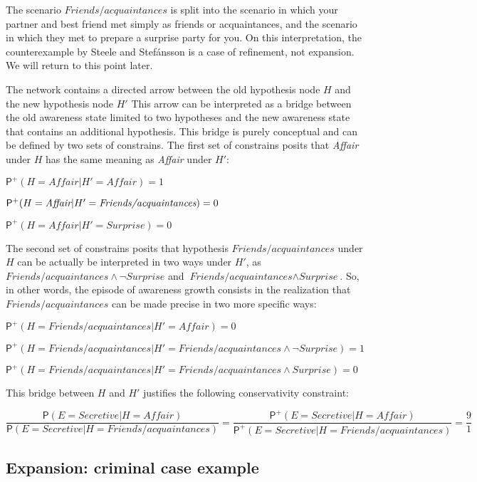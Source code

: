 \documentclass[
  11pt,
  dvipsnames,enabledeprecatedfontcommands]{scrartcl}
\newcommand{\pr}[1]{\ensuremath{\mathsf{P}(#1)}}
\newcommand{\ppr}[2]{\ensuremath{\mathsf{P}^{#1}(#2)}}
\begin{document}
\noindent The scenario \(\textit{Friends/acquaintances}\) is split into
the scenario in which your partner and best friend met simply as friends
or acquaintances, and the scenario in which they met to prepare a
surprise party for you. On this interpretation, the counterexample by
Steele and Stefánsson is a case of refinement, not expansion. We will
return to this point later.

The network contains a directed arrow between the old hypothesis node
\(H\) and the new hypothesis node \(H'\) This arrow can be interpreted
as a bridge between the old awareness state limited to two hypotheses
and the new awareness state that contains an additional hypothesis. This
bridge is purely conceptual and can be defined by two sets of
constrains. The first set of constrains posits that \textit{Affair}
under \(H\) has the same meaning as \textit{Affair} under \(H'\):

\(\ppr{+}{H=\textit{Affair} \vert H'=\textit{Affair}}=1\)

\(\ppr{+}{H=\textit{Affair} \vert H'=\textit{\textit{Friends/acquaintances}}}=0\)

\(\ppr{+}{H=\textit{Affair} \vert H'=\textit{Surprise}}=0\)

The second set of constrains posits that hypothesis
\(\textit{Friends/acquaintances}\) under \(H\) can be actually be
interpreted in two ways under \(H'\), as
\(\textit{Friends/acquaintances} \wedge \neg \textit{Surprise}\) and
\(\textit{Friends/acquaintances} \wedge \textit{Surprise}\). So, in
other words, the episode of awareness growth consists in the realization
that \(\textit{Friends/acquaintances}\) can be made precise in two more
specific ways:

\(\ppr{+}{H=\textit{Friends/acquaintances} \vert H'=\textit{Affair}}=0\)

\(\ppr{+}{H=\textit{Friends/acquaintances} \vert H'=\textit{Friends/acquaintances} \wedge \neg \textit{Surprise}}=1\)

\(\ppr{+}{H=\textit{Friends/acquaintances} \vert H'=\textit{Friends/acquaintances} \wedge \textit{Surprise}}=0\)

This bridge between \(H\) and \(H'\) justifies the following
conservativity constraint:

\[\frac{\pr{E=\textit{Secretive}\vert H=\textit{Affair}}}{\pr{E=\textit{Secretive}\vert H=\textit{Friends/acquaintances}}} = \frac{\ppr{+}{E=\textit{Secretive}\vert H=\textit{Affair}}}{\ppr{+}{E=\textit{Secretive}\vert H=\textit{Friends/acquaintances}}}=\frac{9}{1} \]

\hypertarget{expansion-criminal-case-example}{%
\subsection{Expansion: criminal case
example}\label{expansion-criminal-case-example}}
\end{document}
